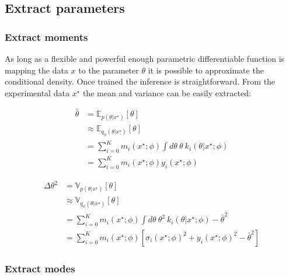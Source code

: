 \subsection{Extract parameters} %
\label{sub:extract_parameters}





\subsubsection{Extract moments} %
\label{ssub:extract_moments}

As long as a flexible and powerful enough parametric differentiable function is mapping the data $x$ to the parameter $\theta$ it is possible to approximate the conditional density.
Once trained the inference is straightforward.
From the experimental data $x^\star$ the mean and variance can be easily extracted:

\begin{align}
    \bar \theta & = \mathbb E_{p(\theta | x^\star)}[\theta] \\
    & \approx \mathbb E_{q_\phi(\theta | x^\star)}[\theta] \\
    & = \sum_{i=0}^K m_i(x^\star ; \phi) \int d\theta ~ \theta ~ k_i(\theta | x^\star ; \phi) \\
    & = \sum_{i=0}^K m_i(x^\star ; \phi) y_i(x^\star ; \phi)
\end{align}

\begin{align}
    \Delta\theta^2 & = \mathbb V_{p(\theta | x^\star)}[\theta] \\
    & \approx \mathbb V_{q_\phi(\theta | x^\star)}[\theta] \\
    & = \sum_{i=0}^K m_i(x^\star ; \phi) \int d\theta ~ \theta^2 ~ k_i(\theta | x^\star ; \phi) - \bar \theta^2 \\
    & = \sum_{i=0}^K m_i(x^\star ; \phi) \left [ \sigma_i(x^\star ; \phi)^2 + y_i(x^\star ; \phi)^2 - \bar \theta^2 \right ]
\end{align}




\subsubsection{Extract modes} %
\label{ssub:extract_modes}










